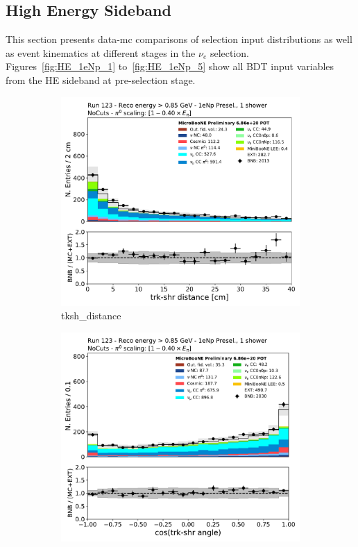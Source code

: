 \subsection{\npsel High Energy Sideband}
\label{app:datasidebandplotdump:nphe}

This section presents data-mc comparisons of selection input distributions as well as event kinematics at different stages in the $\nu_e$ \npsel selection. 
Figures~\ref{fig:HE_1eNp_1} to~\ref{fig:HE_1eNp_5} show all BDT input variables from the HE sideband at pre-selection stage.

\begin{figure}[H]
    \centering
    \begin{subfigure}{0.3\textwidth}
    \includegraphics[width=1.0\textwidth]{Sidebands/Figures/1eNp/HighEnergy/HiEext_NPOneShr_None_pi0e040/tksh_distance.pdf}
    \caption{tksh\_distance}
    \end{subfigure}
    \begin{subfigure}{0.3\textwidth}
    \includegraphics[width=1.0\textwidth]{Sidebands/Figures/1eNp/HighEnergy/HiEext_NPOneShr_None_pi0e040/tksh_angle.pdf}

\end{subfigure}
\end{figure}
